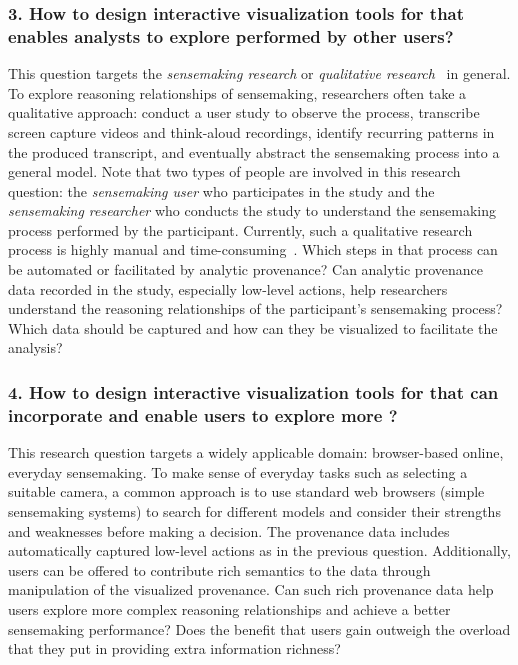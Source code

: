 \subsubsection*{3. How to design interactive visualization tools for  that enables analysts to explore  performed by other users?}
This question targets the \emph{sensemaking research} or \emph{qualitative research}~\cite{Adams2008} in general. To explore reasoning relationships of sensemaking, researchers often take a qualitative approach: conduct a user study to observe the process, transcribe screen capture videos and think-aloud recordings, identify recurring patterns in the produced transcript, and eventually abstract the sensemaking process into a general model. Note that two types of people are involved in this research question: the \emph{sensemaking user} who participates in the study and the \emph{sensemaking researcher} who conducts the study to understand the sensemaking process performed by the participant. Currently, such a qualitative research process is highly manual and time-consuming~\cite{Wong2002}. Which steps in that process can be automated or facilitated by analytic provenance? Can analytic provenance data recorded in the study, especially low-level actions, help researchers understand the reasoning relationships of the participant's sensemaking process? Which data should be captured and how can they be visualized to facilitate the analysis?

\subsubsection*{4. How to design interactive visualization tools for  that can incorporate  and enable users to explore more ?}

This research question targets a widely applicable domain: browser-based online, everyday sensemaking. To make sense of everyday tasks such as selecting a suitable camera, a common approach is to use standard web browsers (simple sensemaking systems) to search for different models and consider their strengths and weaknesses before making a decision. The provenance data includes automatically captured low-level actions as in the previous question. Additionally, users can be offered to contribute rich semantics to the data through manipulation of the visualized provenance. Can such rich provenance data help users explore more complex reasoning relationships and achieve a better sensemaking performance? Does the benefit that users gain outweigh the overload that they put in providing extra information richness?

